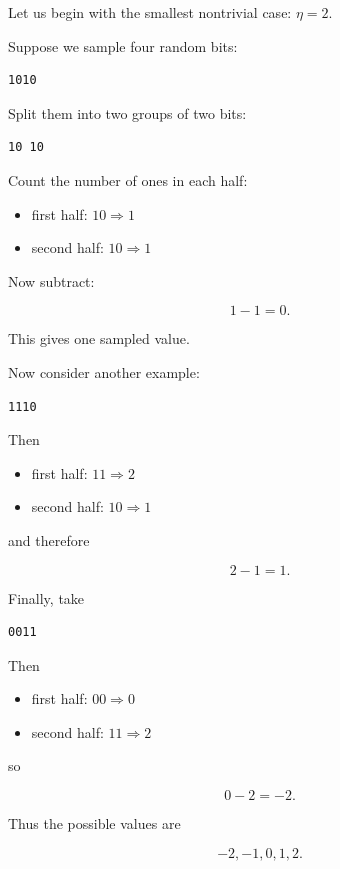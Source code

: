 Let us begin with the smallest nontrivial case: \(\eta=2\).

Suppose we sample four random bits:

\begin{verbatim}
1010
\end{verbatim}

Split them into two groups of two bits:

\begin{verbatim}
10 10
\end{verbatim}

Count the number of ones in each half:

\begin{itemize}
  \item first half: \(10 \Rightarrow 1\)
  \item second half: \(10 \Rightarrow 1\)
\end{itemize}

Now subtract:

\[
1-1 = 0.
\]

This gives one sampled value.

Now consider another example:

\begin{verbatim}
1110
\end{verbatim}

Then

\begin{itemize}
  \item first half: \(11 \Rightarrow 2\)
  \item second half: \(10 \Rightarrow 1\)
\end{itemize}

and therefore

\[
2-1 = 1.
\]

Finally, take

\begin{verbatim}
0011
\end{verbatim}

Then

\begin{itemize}
  \item first half: \(00 \Rightarrow 0\)
  \item second half: \(11 \Rightarrow 2\)
\end{itemize}

so

\[
0-2 = -2.
\]

Thus the possible values are

\[
-2,-1,0,1,2.
\]

